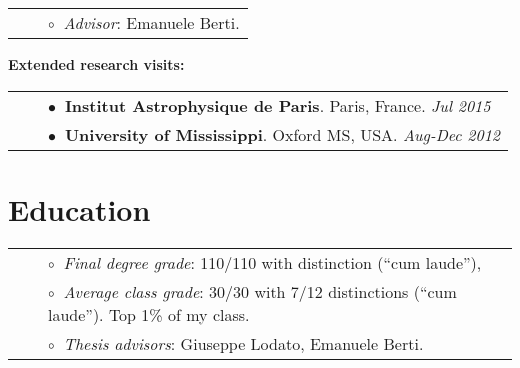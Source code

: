\documentclass[11pt,a4paper,sans]{moderncv}   %
\begin{document}
\vspace{0.3cm}
\vspace{-0.1cm}
\begin{tabular}{rcl}
&\hspace{0.4cm} &$\circ\;\;${\textit{Advisor}}:  Emanuele Berti.\\
\end{tabular}

\vspace{0.3cm}
\textbf{\textcolor{color1}{Extended research visits:}}\vspace{0.15cm}\\ 
\begin{tabular}{rcl}
&\hspace{0.4cm} &$\bullet\;\;${\textbf{Institut Astrophysique de Paris}}. Paris, France. \textit{Jul 2015}\\
&\hspace{0.4cm} &$\bullet\;\;${\textbf{University of Mississippi}}. Oxford MS, USA. \textit{Aug-Dec 2012}\\
\end{tabular}


\section{Education}

\vspace{-0.1cm}
\begin{tabular}{rcl}
&\hspace{0.4cm} &$\circ\;\;${\textit{Final degree grade}}: 110/110 with distinction (``cum laude''),\\
&\hspace{0.4cm} &$\circ\;\;${\textit{Average class grade}}: 30/30 with 7/12 distinctions (``cum laude''). Top 1\% of my class.\\
&\hspace{0.4cm} &$\circ\;\;${\textit{Thesis advisors}}: Giuseppe Lodato, Emanuele Berti.\\
\end{tabular}
 
\end{document}
